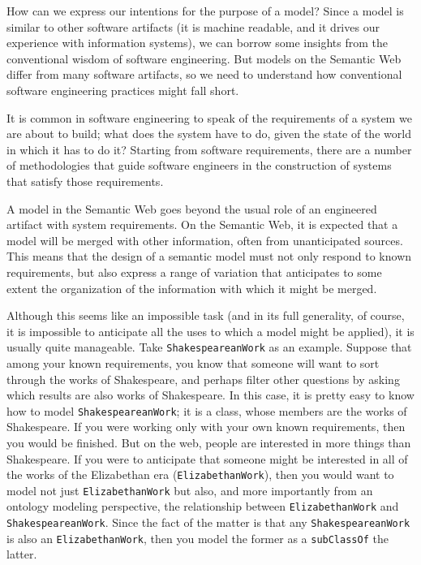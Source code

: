 How can we express our intentions for the purpose of a model?  Since a model
is similar to other software artifacts (it is machine readable, and it drives our 
experience with information systems), we can borrow some insights from the conventional
wisdom of software engineering.  But models on the Semantic Web differ from many
software artifacts, so we need to understand how conventional software 
engineering practices
might fall short.

It is common in software engineering to speak of the 
requirements of a system we are about to build; what does the system have to 
do, given the state of the world in which it has to do it?  Starting from 
software requirements, there are a number of methodologies that guide software 
engineers in the construction of systems that satisfy those requirements. 

A model in the
Semantic Web goes beyond the usual role of an engineered artifact with
system requirements. On the Semantic Web, it is expected that a model
will be merged with other information, often from unanticipated sources.
This means that the design of a semantic model must not only respond to
known requirements, but also
express a range of variation that anticipates to some extent the
organization of the information with which it might be merged.

Although this seems like an impossible task (and in its full generality,
of course, it is
impossible to anticipate all the uses to which a model might be
applied), it is usually quite manageable. Take \texttt{ShakespeareanWork}
as an example.  Suppose that among your known requirements, you know that 
someone will want to sort through the works of Shakespeare, and perhaps
filter other questions by asking which results are also works of Shakespeare. 
In this case, it is pretty easy to know how to model \texttt{ShakespeareanWork}; it 
is a class, whose members are the works of Shakespeare. 
If you were working only with your own known requirements, then you would be
finished.  But on the web, people are interested in more things than Shakespeare.
If you were to anticipate that someone might be interested in all of the works
of the Elizabethan era (\texttt{ElizabethanWork}), then you would want to model not just
\texttt{ElizabethanWork} but also, and more importantly from an ontology modeling 
perspective, the relationship between \texttt{ElizabethanWork} and \texttt{ShakespeareanWork}.  Since the fact of the matter is that any \texttt{ShakespeareanWork} is also an \texttt{ElizabethanWork}, then you model the former as a \texttt{subClassOf} the latter. 

